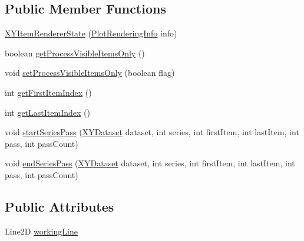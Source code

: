 \subsection*{Public Member Functions}
\begin{DoxyCompactItemize}
\item 
\mbox{\hyperlink{classorg_1_1jfree_1_1chart_1_1renderer_1_1xy_1_1_x_y_item_renderer_state_a98439a7252054d689c17c6da21b50420}{X\+Y\+Item\+Renderer\+State}} (\mbox{\hyperlink{classorg_1_1jfree_1_1chart_1_1plot_1_1_plot_rendering_info}{Plot\+Rendering\+Info}} info)
\item 
boolean \mbox{\hyperlink{classorg_1_1jfree_1_1chart_1_1renderer_1_1xy_1_1_x_y_item_renderer_state_a2c3958fad5fc262ff02d3d770c5249a3}{get\+Process\+Visible\+Items\+Only}} ()
\item 
void \mbox{\hyperlink{classorg_1_1jfree_1_1chart_1_1renderer_1_1xy_1_1_x_y_item_renderer_state_a6d5e7169dccadb2aeb0d56b3767fbfdb}{set\+Process\+Visible\+Items\+Only}} (boolean flag)
\item 
int \mbox{\hyperlink{classorg_1_1jfree_1_1chart_1_1renderer_1_1xy_1_1_x_y_item_renderer_state_a79b974a718391c5d606eb085e67c6850}{get\+First\+Item\+Index}} ()
\item 
int \mbox{\hyperlink{classorg_1_1jfree_1_1chart_1_1renderer_1_1xy_1_1_x_y_item_renderer_state_a7360127dfaccbbd9b1489b75a35e9e16}{get\+Last\+Item\+Index}} ()
\item 
void \mbox{\hyperlink{classorg_1_1jfree_1_1chart_1_1renderer_1_1xy_1_1_x_y_item_renderer_state_af81402a6d5fd64c706dec147748bb8d7}{start\+Series\+Pass}} (\mbox{\hyperlink{interfaceorg_1_1jfree_1_1data_1_1xy_1_1_x_y_dataset}{X\+Y\+Dataset}} dataset, int series, int first\+Item, int last\+Item, int pass, int pass\+Count)
\item 
void \mbox{\hyperlink{classorg_1_1jfree_1_1chart_1_1renderer_1_1xy_1_1_x_y_item_renderer_state_a9ba1098cf2db07474f4108528ad02a22}{end\+Series\+Pass}} (\mbox{\hyperlink{interfaceorg_1_1jfree_1_1data_1_1xy_1_1_x_y_dataset}{X\+Y\+Dataset}} dataset, int series, int first\+Item, int last\+Item, int pass, int pass\+Count)
\end{DoxyCompactItemize}
\subsection*{Public Attributes}
\begin{DoxyCompactItemize}
\item 
Line2D \mbox{\hyperlink{classorg_1_1jfree_1_1chart_1_1renderer_1_1xy_1_1_x_y_item_renderer_state_a7d99790527bdfd8ec40f6e1ef78f84d1}{working\+Line}}
\end{DoxyCompactItemize}


